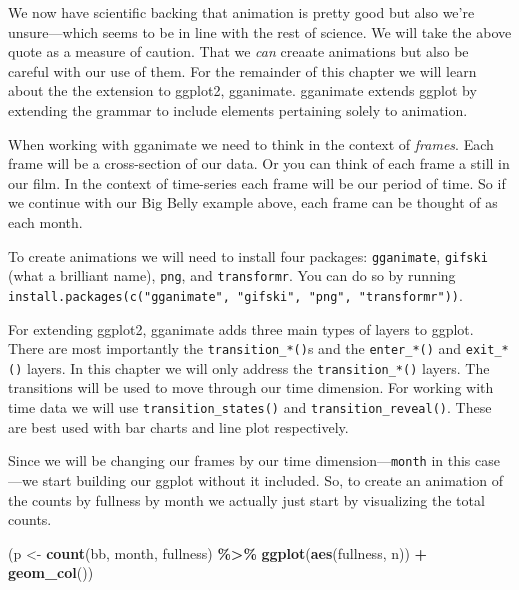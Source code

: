 \documentclass[
]{book}
\newenvironment{Shaded}{\begin{snugshade}}{\end{snugshade}}
\newcommand{\KeywordTok}[1]{\textcolor[rgb]{0.13,0.29,0.53}{\textbf{#1}}}
\newcommand{\NormalTok}[1]{#1}
\newcommand{\OperatorTok}[1]{\textcolor[rgb]{0.81,0.36,0.00}{\textbf{#1}}}
\newcommand{\StringTok}[1]{\textcolor[rgb]{0.31,0.60,0.02}{#1}}
\begin{document}
We now have scientific backing that animation is pretty good but also we're unsure---which seems to be in line with the rest of science. We will take the above quote as a measure of caution. That we \emph{can} creaate animations but also be careful with our use of them. For the remainder of this chapter we will learn about the the extension to ggplot2, gganimate. gganimate extends ggplot by extending the grammar to include elements pertaining solely to animation.

When working with gganimate we need to think in the context of \emph{frames}. Each frame will be a cross-section of our data. Or you can think of each frame a still in our film. In the context of time-series each frame will be our period of time. So if we continue with our Big Belly example above, each frame can be thought of as each month.

To create animations we will need to install four packages: \texttt{gganimate}, \texttt{gifski} (what a brilliant name), \texttt{png}, and \texttt{transformr}. You can do so by running \texttt{install.packages(c("gganimate",\ "gifski",\ "png",\ "transformr"))}.

For extending ggplot2, gganimate adds three main types of layers to ggplot. There are most importantly the \texttt{transition\_*()}s and the \texttt{enter\_*()} and \texttt{exit\_*()} layers. In this chapter we will only address the \texttt{transition\_*()} layers. The transitions will be used to move through our time dimension. For working with time data we will use \texttt{transition\_states()} and \texttt{transition\_reveal()}. These are best used with bar charts and line plot respectively.

Since we will be changing our frames by our time dimension---\texttt{month} in this case---we start building our ggplot without it included. So, to create an animation of the counts by fullness by month we actually just start by visualizing the total counts.

\begin{Shaded}
\begin{Highlighting}[]
\NormalTok{(p \textless{}{-}}\StringTok{ }\KeywordTok{count}\NormalTok{(bb, month, fullness) }\OperatorTok{\%\textgreater{}\%}\StringTok{ }
\StringTok{  }\KeywordTok{ggplot}\NormalTok{(}\KeywordTok{aes}\NormalTok{(fullness, n)) }\OperatorTok{+}
\StringTok{  }\KeywordTok{geom\_col}\NormalTok{())}
\end{Highlighting}
\end{Shaded}
\end{document}
